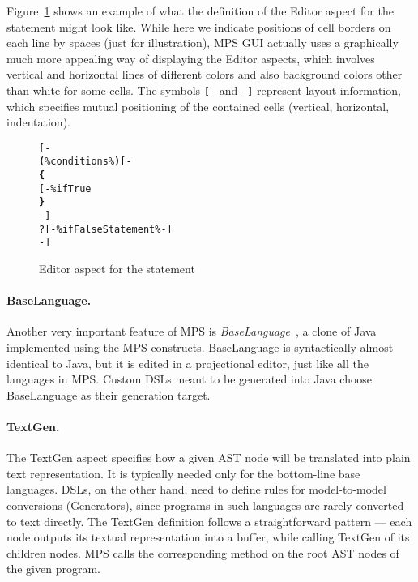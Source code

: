 Figure~\ref{fig:if_editor_definition} shows an example of what the definition of the Editor aspect for the  statement might look like.
While here we indicate positions of cell borders on each line by spaces (just for illustration), MPS GUI actually uses a graphically much more appealing way of displaying the Editor aspects, which involves vertical and horizontal lines of different colors and also background colors other than white for some cells.
The symbols \verb|[-| and \verb|-]| represent layout information, which specifies mutual positioning of the contained cells (vertical, horizontal, indentation).

\begin{figure}[ht]
\vspace{-1mm}
\centering
\begin{alltt}
\small
{}  
    [-
       \textbf{(} \% conditions \% \textbf{)} [-
      \textbf{\{}
      [- \% ifTrue % -]
      \textbf{\}}
      -]
      ?[-  \% ifFalseStatement \% -]
    -]
\end{alltt}
\vspace{-1mm}
\caption{Editor aspect for the  statement}
\label{fig:if_editor_definition}
\vspace{-2mm}
\end{figure}

\paragraph{BaseLanguage.}
Another very important feature of MPS is \emph{BaseLanguage}~\cite{ref:BASELANG}, a clone of Java implemented using the MPS constructs.
BaseLanguage is syntactically almost identical to Java, but it is edited in a projectional editor, just like all the languages in MPS.
Custom DSLs meant to be generated into Java choose BaseLanguage as their generation target.

\paragraph{TextGen.}
The TextGen aspect specifies how a given AST node will be translated into plain text representation.
It is typically needed only for the bottom-line base languages.
DSLs, on the other hand, need to define rules for model-to-model conversions (Generators), since programs in such languages are rarely converted to text directly.
The TextGen definition follows a straightforward pattern --- each node outputs its textual representation into a buffer, while calling TextGen of its children nodes.
MPS calls the corresponding method on the root AST nodes of the given program.

